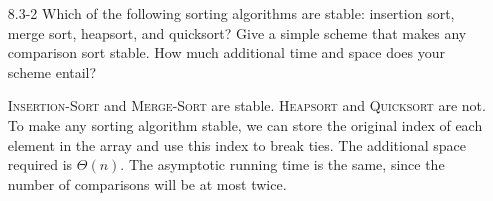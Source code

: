 \begin{enumerate}

\item[8.3-2]{Which of the following sorting algorithms are stable: insertion
sort, merge sort, heapsort, and quicksort? Give a simple scheme that makes any
comparison sort stable. How much additional time and space does your scheme
entail?}

\begin{framed}
\textsc{Insertion-Sort} and \textsc{Merge-Sort} are stable. \textsc{Heapsort}
and \textsc{Quicksort} are not. To make any sorting algorithm stable, we can
store the original index of each element in the array and use this index to
break ties. The additional space required is $\Theta(n)$. The asymptotic running
time is the same, since the number of comparisons will be at most twice.
\end{framed}


\end{enumerate}
